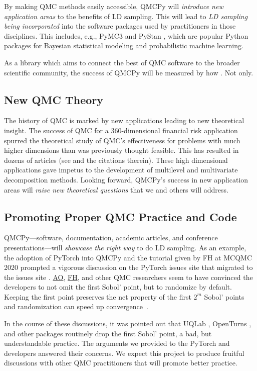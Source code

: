 \documentclass[11pt]{NSFamsart}
\newcommand{\FH}{\hyperlink{FHlink}{FH}\xspace}
\newcommand{\AO}{\hyperlink{AOlink}{AO}\xspace}
\begin{document}
By making QMC methods easily accessible, QMCPy will \emph{introduce new application areas} to the benefits of LD sampling.  This will lead to \emph{LD sampling being incorporated} into the software packages used by practitioners in those disciplines. This includes, e.g., PyMC3 \citep{salvatier2016probabilistic} and PyStan \citep{stan2017pystan}, which are popular Python packages for Bayesian statistical modeling and probabilistic machine learning.

As a library which aims to connect the best of QMC software to the broader scientific community, the success of QMCPy will be measured by how . Not only.

\subsection{New QMC Theory}
The history of QMC is marked by new applications leading to new theoretical insight.  The success of QMC for a $360$-dimensional financial risk application \cite{PasTra95} spurred the theoretical study of QMC's effectiveness for problems with much higher dimensions than was previously thought feasible.  This has resulted in dozens of articles (see \cite{NovWoz10a,DicEtal14a} and the citations therein).  These high dimensional applications gave impetus to the development of multilevel \cite{Gil15a} and multivariate decomposition \cite{KuoEtal17a} methods. Looking forward, QMCPy's success in new application areas will \emph{raise new theoretical questions} that we and others will address.

\subsection{Promoting Proper QMC Practice and Code}
QMCPy---software, documentation, academic articles, and conference presentations---will \emph{showcase the right way} to do LD sampling.  As an example, the adoption of PyTorch into QMCPy and the tutorial given by FH at MCQMC 2020 \cite{MCQMC2020QMCPyTut} prompted a vigorous discussion on the PyTorch issues site \cite{PyTorchFirstPt2020a} that migrated to the  issues site \cite{scipySobol2020a}.  \AO, \FH, and other QMC researchers seem to have convinced the developers to not omit the first Sobol' point, but to randomize by default.  Keeping the first point preserves the net property of the first $2^m$ Sobol' points and randomization can speed up convergence~\cite{owen2020dropping}.

In the course of these discussions, it was pointed out that UQLab \cite{UQLab}, OpenTurns \cite{OpenTURNS}, and other packages routinely drop the first Sobol' point, a bad, but understandable practice.  The arguments we provided to the PyTorch and  developers answered their concerns.  We expect this project to produce fruitful discussions with other QMC practitioners that will promote better practice.
\end{document}
